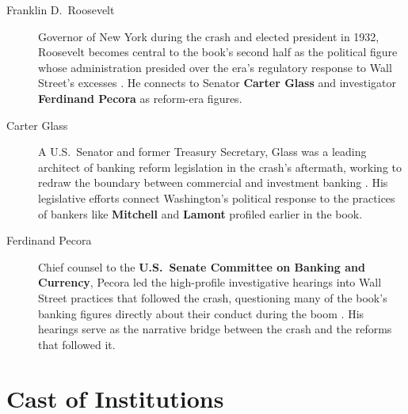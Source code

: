 \documentclass[11pt]{article}
\newcommand{\charname}[1]{\textbf{#1}}
\begin{document}
\begin{description}
\item[Franklin D.\ Roosevelt] Governor of New York during the crash and elected
president in 1932, Roosevelt becomes central to the book's second half as the
political figure whose administration presided over the era's regulatory
response to Wall Street's excesses \autocite{supersummary1929,libraryjournal1929}.
He connects to Senator \charname{Carter Glass} and investigator
\charname{Ferdinand Pecora} as reform-era figures.

\item[Carter Glass] A U.S.\ Senator and former Treasury Secretary, Glass was a
leading architect of banking reform legislation in the crash's aftermath,
working to redraw the boundary between commercial and investment banking
\autocite{libraryjournal1929}. His legislative efforts connect Washington's
political response to the practices of bankers like \charname{Mitchell} and
\charname{Lamont} profiled earlier in the book.

\item[Ferdinand Pecora] Chief counsel to the \charname{U.S.\ Senate Committee
on Banking and Currency}, Pecora led the high-profile investigative hearings
into Wall Street practices that followed the crash, questioning many of the
book's banking figures directly about their conduct during the boom
\autocite{libraryjournal1929,dailyeconomy1929}. His hearings serve as the
narrative bridge between the crash and the reforms that followed it.

\end{description}

\section{Cast of Institutions}
\label{sec:cast-institutions}
\end{document}
